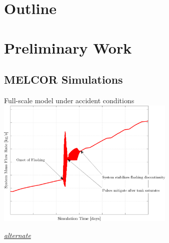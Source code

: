 \documentclass[10pt,t,xcolor=table]{beamer}
\author{#2}
\author[#1]{#2}
\institute{#2}
\institute[#1]{#2}
\title{#2}
\title[#1]{#2}
\date{12/17/2012}
\begin{document}
\begin{frame}
    \titlepage
\end{frame}


\section*{Outline}
\begin{frame}
    \tableofcontents
\end{frame}







\section{Preliminary Work}
    
    \subsection{MELCOR Simulations}
    \begin{frame}[label=MassFlowAnnotate]{Full-scale model under accident conditions}
        \hspace{4.9em}\includegraphics[height=2.4in]{PowerProfiles_MassFlowRateAnnotationsThesis}
        
        \hfill\textit{\tiny\hyperlink{MassFlow4Days}{alternate}}
    \end{frame}
\end{document}
